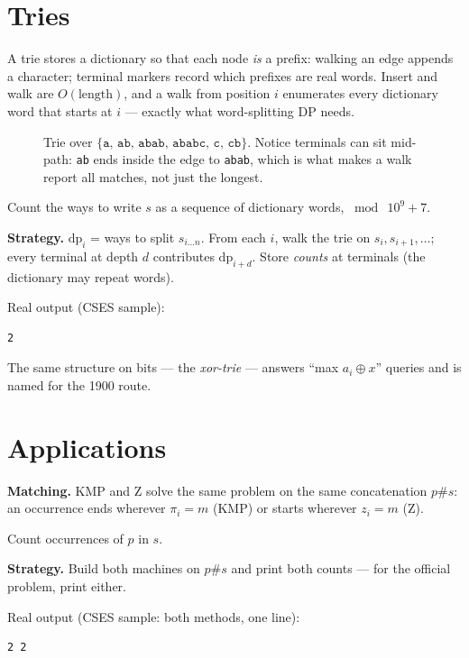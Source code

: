 \section{Tries}\label{sec:trie}
A trie stores a dictionary so that each node \emph{is} a prefix:
walking an edge appends a character; terminal markers record which
prefixes are real words. Insert and walk are $O(\text{length})$,
and a walk from position $i$ enumerates every dictionary word that
starts at $i$ --- exactly what word-splitting DP needs.

\begin{figure}[ht]\centering

\caption{Trie over $\{\texttt{a, ab, abab, ababc, c, cb}\}$.
Notice terminals can sit mid-path: \texttt{ab} ends inside the
edge to \texttt{abab}, which is what makes a walk report all
matches, not just the longest.}
\label{fig:trie}
\end{figure}
\begin{example}\label{ex:words}
Count the ways to write $s$ as a sequence of dictionary words,
$\bmod\ 10^9{+}7$.
\par\smallskip
\textbf{Strategy.} $\mathrm{dp}_i$ = ways to split $s_{i\dots n}$.
From each $i$, walk the trie on $s_i, s_{i+1}, \dots$; every
terminal at depth $d$ contributes $\mathrm{dp}_{i+d}$. Store
\emph{counts} at terminals (the dictionary may repeat words).
\par\smallskip
\begin{solution}

Real output (CSES sample):
\begin{lstlisting}[numbers=none]
2
\end{lstlisting}
\end{solution}
\end{example}
The same structure on bits --- the \emph{xor-trie} --- answers
``max $a_i \oplus x$'' queries and is named for the 1900 route.

\section{Applications}\label{sec:strapp}
\textbf{Matching.} KMP and Z solve the same problem on the same
concatenation $p\#s$: an occurrence ends wherever $\pi_i = m$
(KMP) or starts wherever $z_i = m$ (Z).
\begin{example}\label{ex:match}
Count occurrences of $p$ in $s$.
\par\smallskip
\textbf{Strategy.} Build both machines on $p\#s$ and print both
counts --- for the official problem, print either.
\par\smallskip
\begin{solution}

Real output (CSES sample: both methods, one line):
\begin{lstlisting}[numbers=none]
2 2
\end{lstlisting}
\end{solution}
\end{example}

